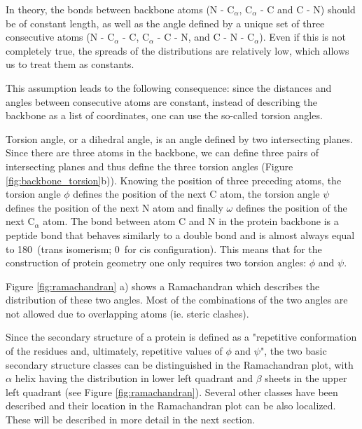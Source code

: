 In theory, the bonds between backbone atoms (N - C$_\alpha$, C$_\alpha$ - C and C - N) should be of constant length, as well as the angle defined by a unique set of three consecutive atoms (N - C$_\alpha$ - C, C$_\alpha$ - C - N, and C - N - C$_\alpha$). 
Even if this is not completely true, the spreads of the distributions are relatively low, which allows us to treat them as constants.

This assumption leads to the following consequence: since the distances and angles between consecutive atoms are constant, instead of describing the backbone as a list of coordinates, one can use the so-called torsion angles.

Torsion angle, or a dihedral angle, is an angle defined by two intersecting planes. 
Since there are three atoms in the backbone, we can define three pairs of intersecting planes and thus define the three torsion angles (Figure \ref{fig:backbone_torsion}b)). 
Knowing the position of three preceding atoms, the torsion angle $\phi$ defines the position of the next C atom, the torsion angle $\psi$ defines the position of the next N atom and finally $\omega$ defines the position of the next C$_\alpha$ atom. 
The bond between atom C and N in the protein backbone is a peptide bond that behaves similarly to a double bond and is almost always equal to 180\degree~(trans isomerism; 0\degree~for cis configuration). 
This means that for the construction of protein geometry one only requires two torsion angles: $\phi$ and $\psi$.

Figure \ref{fig:ramachandran} a) shows a Ramachandran which describes the distribution of these two angles. 
Most of the combinations of the two angles are not allowed due to overlapping atoms (ie. steric clashes). 

Since the secondary structure of a protein is defined as a "repetitive conformation of the residues and, ultimately, repetitive values of $\phi$ and $\psi$", the two basic secondary structure classes can be distinguished in the Ramachandran plot, with $\alpha$ helix having the distribution in lower left quadrant and $\beta$ sheets in the upper left quadrant (see Figure \ref{fig:ramachandran}). 
Several other classes have been described and their location in the Ramachandran plot can be also localized. These will be described in more detail in the next section. 

